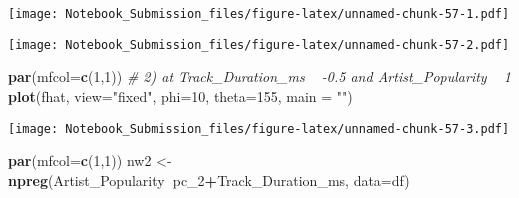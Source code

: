 \documentclass[
]{article}
\newenvironment{Shaded}{\begin{snugshade}}{\end{snugshade}}
\newcommand{\CommentTok}[1]{\textcolor[rgb]{0.56,0.35,0.01}{\textit{#1}}}
\newcommand{\DataTypeTok}[1]{\textcolor[rgb]{0.13,0.29,0.53}{#1}}
\newcommand{\DecValTok}[1]{\textcolor[rgb]{0.00,0.00,0.81}{#1}}
\newcommand{\KeywordTok}[1]{\textcolor[rgb]{0.13,0.29,0.53}{\textbf{#1}}}
\newcommand{\NormalTok}[1]{#1}
\newcommand{\OperatorTok}[1]{\textcolor[rgb]{0.81,0.36,0.00}{\textbf{#1}}}
\newcommand{\StringTok}[1]{\textcolor[rgb]{0.31,0.60,0.02}{#1}}
\begin{document}
\texttt{[image: Notebook\_Submission\_files/figure-latex/unnamed-chunk-57-1.pdf]}

\begin{Shaded}
\end{Shaded}

\texttt{[image: Notebook\_Submission\_files/figure-latex/unnamed-chunk-57-2.pdf]}

\begin{Shaded}
\begin{Highlighting}[]
\KeywordTok{par}\NormalTok{(}\DataTypeTok{mfcol=}\KeywordTok{c}\NormalTok{(}\DecValTok{1}\NormalTok{,}\DecValTok{1}\NormalTok{))}
\CommentTok{# 2) at Track_Duration_ms ~ -0.5 and Artist_Popularity ~ 1}
\KeywordTok{plot}\NormalTok{(fhat, }\DataTypeTok{view=}\StringTok{"fixed"}\NormalTok{, }\DataTypeTok{phi=}\DecValTok{10}\NormalTok{, }\DataTypeTok{theta=}\DecValTok{155}\NormalTok{, }\DataTypeTok{main =} \StringTok{""}\NormalTok{)}
\end{Highlighting}
\end{Shaded}

\texttt{[image: Notebook\_Submission\_files/figure-latex/unnamed-chunk-57-3.pdf]}

\begin{Shaded}
\begin{Highlighting}[]
\KeywordTok{par}\NormalTok{(}\DataTypeTok{mfcol=}\KeywordTok{c}\NormalTok{(}\DecValTok{1}\NormalTok{,}\DecValTok{1}\NormalTok{))}
\NormalTok{nw2 <-}\StringTok{ }\KeywordTok{npreg}\NormalTok{(Artist_Popularity}\OperatorTok{~}\NormalTok{pc_}\DecValTok{2}\OperatorTok{+}\NormalTok{Track_Duration_ms, }\DataTypeTok{data=}\NormalTok{df)}
\end{Highlighting}
\end{Shaded}
\end{document}
